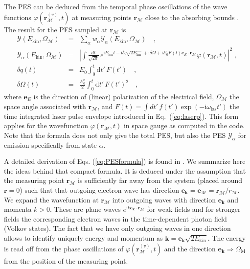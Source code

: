 \documentclass[final,1p]{elsarticle}
\begin{document}
The PES can be deduced from the temporal phase oscillations of the
wave functions $\varphi(\mathbf{r}^{(v)}_\mathcal{M},t)$ at measuring
points $\mathbf{r}_\mathcal{M}$ close to the absorbing bounds
\cite{Poh00}.  The result for the PES sampled at
$\mathbf{r}_\mathcal{M}$ is
\begin{subequations}
\label{eq:PESformula}
\begin{eqnarray}
  \mathcal{Y}(E_\mathrm{kin},\Omega_\mathcal{M})
  &=&
  \sum_\alpha w_\alpha
  \mathcal{Y}_\alpha(E_\mathrm{kin},\Omega_\mathcal{M})
  \quad,
\\
  \mathcal{Y}_\alpha(E_\mathrm{kin},\Omega_\mathcal{M})
  &=&
  \left|
  \!\int\!\frac{dt}{\sqrt{2\pi}}\,e^{\mathrm{i}E_\mathrm{kin}t
              -\mathrm{i}\delta q\sqrt{2E_\mathrm{kin}}
              +\mathrm{i}\delta\Omega
              +\mathrm{i}E_0F(t)\mathbf{e}_E\cdot\mathbf{r}_\mathcal{M}}
               \varphi(\mathbf{r}_\mathcal{M},t)
  \right|^2
  \;,
\label{eq:solve-wf}
\\
  \delta q(t)
  &=&
  E_0 \int_{0}^t\mathrm dt'\,F(t')
  \quad,
\label{eq:delq}\\
  \delta\Omega(t)
  &=&
  \frac{E_0^2}{2}\int_{0}^t\mathrm dt'\,F(t')^2
  \quad,
\label{eq:delOmega}
\end{eqnarray}
\end{subequations}
where $\mathbf{e}_E$ is the direction of (linear) polarization of the
electrical field, $\Omega_\mathcal{M}$ the space angle associated with
$\mathbf{r}_\mathcal{M}$, and
$F(t)=\int{d}t'\,f(t')\exp{(-\mathrm{i}\omega_\mathrm{las}t')}$ the
time integrated laser pulse envelope introduced in
Eq.~(\ref{eq:laserp}).  This form applies for the wavefunction
$\varphi(\mathbf{r}_\mathcal{M},t)$ in space gauge as computed in the
code. Note that the formula does not only give the total PES, but also
the PES $\mathcal{Y}_\alpha$ for emission specifically from state
$\alpha$.

A detailed derivation of Eqs. (\ref{eq:PESformula}) is found in
\cite{Din13a}.  We summarize here the ideas behind that compact
formula.  It is deduced under the assumption that the measuring point
$\mathbf{r}_\mathcal{M}$ is sufficiently far away from the system
(placed around $\mathbf{r}=0$) such that that outgoing electron wave
has direction
$\mathbf{e}_{\mathbf{k}}=\mathbf{e}_\mathcal{M}=\mathbf{r}_\mathcal{M}/r_\mathcal{M}$.
We expand the wavefunction at $\mathbf{r}_\mathcal{M}$ into outgoing
waves with direction $\mathbf{e}_{\mathbf{k}}$ and momenta
$k>0$. These are plane waves
$e^{\mathrm{i}k\mathbf{e}_{\mathbf{k}}\cdot\mathbf{r}_\mathcal{M}}$
for weak fields and for stronger fields the corresponding electron
waves in the time-dependent photon field (Volkov states).  The fact
that we have only outgoing waves in one direction allows to identify
uniquely energy and momentum as
$\mathbf{k}=\mathbf{e}_{\mathbf{k}}\sqrt{2E_\mathrm{kin}}$.  The
energy is read off from the phase oscillations of
$\varphi(\mathbf{r}^{(v)}_\mathcal{M},t)$ and the direction
$\mathbf{e}_{\mathbf{k}}\Rightarrow\Omega_\mathrm{M}$ from the
position of the measuring point.
\end{document}
